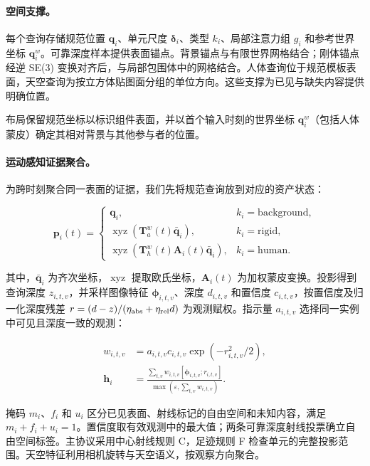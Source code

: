 \label{sec:queries}

\paragraph{空间支撑。}

每个查询存储规范位置 $\mathbf q_i$、单元尺度 $\boldsymbol\delta_i$、类型 $k_i$、局部注意力组 $g_i$ 和参考世界坐标 $\mathbf q_i^w$。可靠深度样本提供表面锚点。背景锚点与有限世界网格结合；刚体锚点经逆 SE(3) 变换对齐后，与局部包围体中的网格结合。人体查询位于规范模板表面，天空查询为按立方体贴图面分组的单位方向。这些支撑为已见与缺失内容提供明确位置。

布局保留规范坐标以标识组件表面，并以首个输入时刻的世界坐标 $\mathbf q_i^w$（包括人体蒙皮）确定其相对背景与其他参与者的位置。

\paragraph{运动感知证据聚合。}

为跨时刻聚合同一表面的证据，我们先将规范查询放到对应的资产状态：

\begin{equation}
\mathbf p_i(t)=
\begin{cases}
\mathbf q_i,& k_i=\mathrm{background},\\
\operatorname{xyz}(\mathbf T^w_a(t)\bar{\mathbf q}_i),& k_i=\mathrm{rigid},\\
\operatorname{xyz}(\mathbf T^w_h(t)\mathbf A_i(t)\bar{\mathbf q}_i),& k_i=\mathrm{human}.
\end{cases}
\label{eq:query-placement}
\end{equation}

其中，$\bar{\mathbf q}_i$ 为齐次坐标，$\operatorname{xyz}$ 提取欧氏坐标，$\mathbf A_i(t)$ 为加权蒙皮变换。投影得到查询深度 $z_{i,t,v}$，并采样图像特征 $\boldsymbol\phi_{i,t,v}$、深度 $d_{i,t,v}$ 和置信度 $c_{i,t,v}$，按置信度及归一化深度残差 $r=(d-z)/(\eta_{\rm abs}+\eta_{\rm rel}d)$ 为观测赋权。指示量 $a_{i,t,v}$ 选择同一实例中可见且深度一致的观测：

\begin{align}
w_{i,t,v}&=a_{i,t,v}c_{i,t,v}\exp(-r_{i,t,v}^2/2),\\
\mathbf h_i&=\frac{\sum_{t,v}w_{i,t,v}[\boldsymbol\phi_{i,t,v};r_{i,t,v}]}
{\max(\varepsilon,\sum_{t,v}w_{i,t,v})}.
\label{eq:aggregation}
\end{align}

掩码 $m_i$、$f_i$ 和 $u_i$ 区分已见表面、射线标记的自由空间和未知内容，满足 $m_i+f_i+u_i=1$。置信度取有效观测中的最大值；两条可靠深度射线投票确立自由空间标签。主协议采用中心射线规则 C，足迹规则 F 检查单元的完整投影范围。天空特征利用相机旋转与天空语义，按观察方向聚合。

